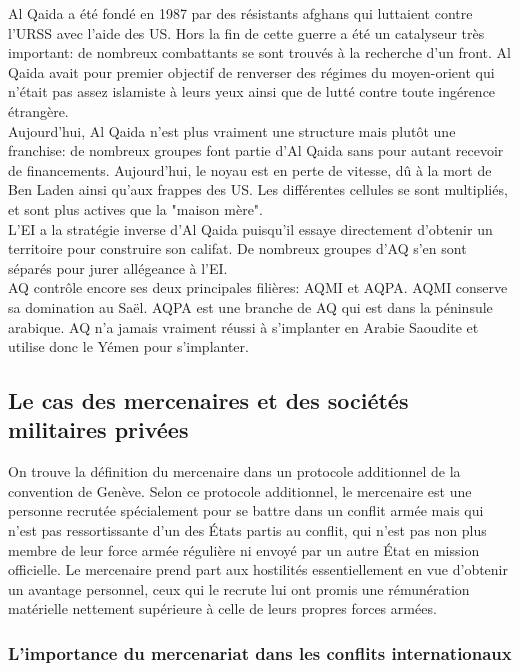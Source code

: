 \documentclass[10pt, a4paper, openany]{book}
\begin{document}
Al Qaida a été fondé en 1987 par des résistants afghans qui luttaient contre l'URSS avec l'aide des US. Hors la fin de cette guerre a été un catalyseur très important: de nombreux combattants se sont trouvés à la recherche d'un front. Al Qaida avait pour premier objectif de renverser des régimes du moyen-orient qui n'était pas assez islamiste à leurs yeux ainsi que de lutté contre toute ingérence étrangère. \\
Aujourd'hui, Al Qaida n'est plus vraiment une structure mais plutôt une franchise: de nombreux groupes font partie d'Al Qaida sans pour autant recevoir de financements. Aujourd'hui, le noyau est en perte de vitesse, dû à la mort de Ben Laden ainsi qu'aux frappes des US. Les différentes cellules se sont multipliés, et sont plus actives que la "maison mère". \\
L'EI a la stratégie inverse d'Al Qaida puisqu'il essaye directement d'obtenir un territoire pour construire son califat. De nombreux groupes d'AQ s'en sont séparés pour jurer allégeance à l'EI. \\
AQ contrôle encore ses deux principales filières: AQMI et AQPA. AQMI conserve sa domination au Saël. AQPA est une branche de AQ qui est dans la péninsule arabique. AQ n'a jamais vraiment réussi à s'implanter en Arabie Saoudite et utilise donc le Yémen pour s'implanter. 

\subsection{Le cas des mercenaires et des sociétés militaires privées}

On trouve la définition du mercenaire dans un protocole additionnel de la convention de Genève. Selon ce protocole additionnel, le mercenaire est une personne recrutée spécialement pour se battre dans un conflit armée mais qui n'est pas ressortissante d'un des États partis au conflit, qui n'est pas non plus membre de leur force armée régulière ni envoyé par un autre État en mission officielle. Le mercenaire prend part aux hostilités essentiellement en vue d'obtenir un avantage personnel, ceux qui le recrute lui ont promis une rémunération matérielle nettement supérieure à celle de leurs propres forces armées.

\subsubsection{L'importance du mercenariat dans les conflits internationaux}
\end{document}
